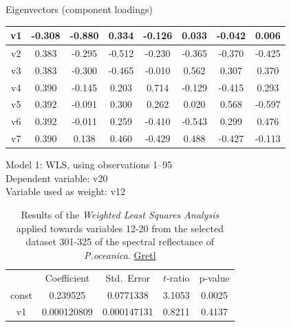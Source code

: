 \documentclass[11pt]{article}
\begin{document}
\begin{appendices}
\begin{table}[H]
\begin{center}
	Eigenvectors (component loadings)
	
	\vspace{1ex}
	
		\begin{tabular}{|c|c|c|c|c|c|c|c|}
			v1        &	     -0.308  &	  -0.880  &	   0.334   &	 -0.126  &	   0.033  &	  -0.042   &	  0.006\\ \hline
			v2      &	      0.383  &	  -0.295  &	  -0.512   &	 -0.230  &	  -0.365  &	  -0.370   &	 -0.425\\ \hline
			v3      &	      0.383  &	  -0.300  &	  -0.465   &	 -0.010  &	   0.562  &	   0.307   &	  0.370\\ \hline
			v4      &	      0.390  &	  -0.145  &	   0.203   &	  0.714  &	  -0.129  &	  -0.415   &	  0.293\\ \hline
			v5      &	      0.392  &	  -0.091  &	   0.300   &	  0.262  &	   0.020  &	   0.568   &	 -0.597\\ \hline
			v6      &	      0.392  &	  -0.011  &	   0.259   &	 -0.410  &	  -0.543  &	   0.299   &	  0.476\\ \hline
			v7      &	      0.390  &	   0.138  &	   0.460   &	 -0.429  &	   0.488  &	  -0.427   &	 -0.113\\ \hline
		\end{tabular}
	\end{center}
	\label{tab:24}
\end{table}
\pagebreak

\begin{table}[H]
	\begin{center}
	\caption{Results of the \textit{Weighted Least Squares Analysis} applied towards variables 12-20 from the selected dataset 301-325 of the spectral reflectance of \textit{P.oceanica}. \href{http://gretl.sourceforge.net/}{Gretl}}
		Model 1: WLS, using observations 1--95\\
		Dependent variable: v20\\
		Variable used as weight: v12

	\vspace{1em}
	\begin{tabular}{|c|c|c|c|c|}
		  & {Coefficient} & {Std.\ Error} & {$t$-ratio} & {p-value} \\[1ex]
		const &   0.239525 &     0.0771338 & 3.1053 &         0.0025 \\
		v1 &   0.000120809 &     0.000147131 &       0.8211 &         0.4137 \\
	\end{tabular}


\end{center}
\end{table}
\end{appendices}
\end{document}
